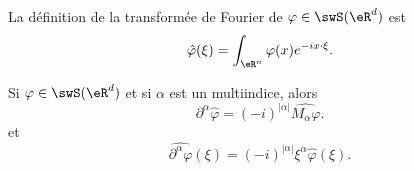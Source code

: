 La définition de la transformée de Fourier de \( \varphi\in\swS(\eR^d)\) est 
\begin{equation}
    \hat  \varphi(\xi)=\int_{\eR^n}\varphi(x) e^{-ix\cdot \xi}.
\end{equation}

\begin{lemma}   \label{LemQPVQjCx}
    Si \( \varphi\in\swS(\eR^d)\) et si \( \alpha\) est un multiindice, alors
    \begin{equation}
        \partial^{\alpha}\hat\varphi=(-i)^{| \alpha |}\widehat{M_{\alpha}\varphi}.
    \end{equation}
    et
    \begin{equation}
        \widehat{\partial^{\alpha}\varphi}(\xi)=(-i)^{| \alpha |}\xi^{\alpha}\hat\varphi(\xi).
    \end{equation}
\end{lemma}

